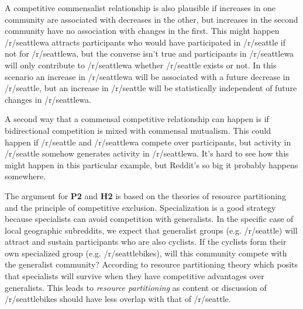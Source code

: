 \documentclass[12pt]{memoir}
\begin{document}
A competitive commensalist relationship is also plausible if increases in one community are associated with decreases in the other, but increases in the second community have no association with changes in the first.  This might happen  /r/seattlewa attracts participants who would have participated in /r/seattle if not for /r/seattlewa, but the converse isn't true and participants in /r/seattlewa will only contribute to /r/seattlewa whether /r/seattle exists or not.  In this scenario an increase in /r/seattlewa will be associated with a future decrease in /r/seattle, but an increase in /r/seattle will be statistically independent of future changes in /r/seattlewa.

A second way that a commensal competitive relationship can happen is if bidirectional competition is mixed with commensal mutualism. This could happen if /r/seattle and /r/seattlewa compete over participants, but activity in /r/seattle somehow generates activity in /r/seattlewa. It's hard to see how this might happen in this particular example, but Reddit's so big it probably happens somewhere. 



The argument for \textbf{P2} and \textbf{H2} is based on the theories of resource partitioning and the principle of competitive exclusion.  Specialization is a good strategy because specialists can avoid competition with generalists.  In the specific case of local geographic subreddits, we expect that generalist groups (e.g. /r/seattle) will attract and sustain participants who are also cyclists.  If the cyclists form their own specialized group (e.g. /r/seattlebikes), will this community compete with the generalist community?  According to resource partitioning theory which posits that specialists will survive when they have competitive advantages over generalists.  This leads to \emph{resource partitioning} as content or discussion of /r/seattlebikes should have less overlap with that of /r/seattle.  

\end{document}
